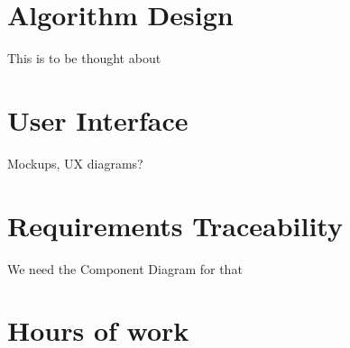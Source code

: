 \documentclass[12pt]{article}
\begin{document}
\clearpage
\section{Algorithm Design}
This is to be thought about
\clearpage
\section{User Interface}
Mockups, UX diagrams?
\clearpage
\section{Requirements Traceability}
We need the Component Diagram for that
\clearpage
\section{Hours of work}
\end{document}
